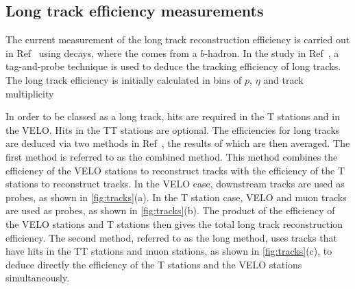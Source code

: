 
\subsection{Long track efficiency measurements}
\label{sec:long}
The current measurement of the long track reconstruction efficiency is carried out in Ref~\cite{LHCB-DP-2013-002} using \jpsi \to \mumu decays, where the \jpsi comes from a $b$-hadron. In the study in Ref~\cite{LHCB-DP-2013-002}, a tag-and-probe technique is used to deduce the tracking efficiency of long tracks. The long track efficiency is initially calculated in bins of $p$, $\eta$ and track multiplicity %





In order to be classed as a long track, hits are required in the T stations and in the VELO. Hits in the TT stations are optional. The efficiencies for long tracks are deduced via two methods in Ref~\cite{LHCB-DP-2013-002}, the results of which are then averaged. The first method is referred to as the combined method. This method combines the efficiency of the VELO stations to reconstruct tracks with the efficiency of the T stations to reconstruct tracks. In the VELO case, downstream tracks are used as probes, as shown in \autoref{fig:tracks}(a). In the T station case, VELO and muon tracks are used as probes, as shown in \autoref{fig:tracks}(b). The  product of the efficiency of the VELO stations and T stations then gives the total long track reconstruction efficiency. The second method, referred to as the long method, uses tracks that have hits in the TT stations and muon stations, as shown in \autoref{fig:tracks}(c), to  deduce directly the efficiency of the T stations and the VELO stations simultaneously.

